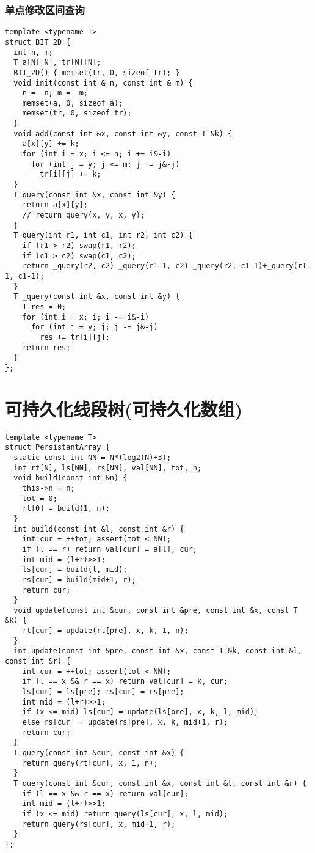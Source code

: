 \documentclass[12pt]{article}
\begin{document}
{{{{{{{{{{{{{{{{{{\subsubsection{单点修改区间查询}
{\setmainfont{Consolas}
\begin{lstlisting}
template <typename T>
struct BIT_2D {
  int n, m;
  T a[N][N], tr[N][N];
  BIT_2D() { memset(tr, 0, sizeof tr); }
  void init(const int &_n, const int &_m) {
    n = _n; m = _m;
    memset(a, 0, sizeof a);
    memset(tr, 0, sizeof tr);
  }
  void add(const int &x, const int &y, const T &k) {
    a[x][y] += k;
    for (int i = x; i <= n; i += i&-i)
      for (int j = y; j <= m; j += j&-j)
        tr[i][j] += k;
  }
  T query(const int &x, const int &y) {
    return a[x][y];
    // return query(x, y, x, y);
  }
  T query(int r1, int c1, int r2, int c2) {
    if (r1 > r2) swap(r1, r2);
    if (c1 > c2) swap(c1, c2);
    return _query(r2, c2)-_query(r1-1, c2)-_query(r2, c1-1)+_query(r1-1, c1-1);
  }
  T _query(const int &x, const int &y) {
    T res = 0;
    for (int i = x; i; i -= i&-i)
      for (int j = y; j; j -= j&-j)
        res += tr[i][j];
    return res;
  }
};
\end{lstlisting}

\section{可持久化线段树(可持久化数组)}

{\setmainfont{Consolas}
\begin{lstlisting}
template <typename T>
struct PersistantArray {
  static const int NN = N*(log2(N)+3);
  int rt[N], ls[NN], rs[NN], val[NN], tot, n;
  void build(const int &n) {
    this->n = n;
    tot = 0;
    rt[0] = build(1, n);
  }
  int build(const int &l, const int &r) {
    int cur = ++tot; assert(tot < NN);
    if (l == r) return val[cur] = a[l], cur;
    int mid = (l+r)>>1;
    ls[cur] = build(l, mid);
    rs[cur] = build(mid+1, r);
    return cur;
  }
  void update(const int &cur, const int &pre, const int &x, const T &k) {
    rt[cur] = update(rt[pre], x, k, 1, n);
  }
  int update(const int &pre, const int &x, const T &k, const int &l, const int &r) {
    int cur = ++tot; assert(tot < NN);
    if (l == x && r == x) return val[cur] = k, cur;
    ls[cur] = ls[pre]; rs[cur] = rs[pre];
    int mid = (l+r)>>1;
    if (x <= mid) ls[cur] = update(ls[pre], x, k, l, mid);
    else rs[cur] = update(rs[pre], x, k, mid+1, r);
    return cur;
  }
  T query(const int &cur, const int &x) {
    return query(rt[cur], x, 1, n);
  }
  T query(const int &cur, const int &x, const int &l, const int &r) {
    if (l == x && r == x) return val[cur];
    int mid = (l+r)>>1;
    if (x <= mid) return query(ls[cur], x, l, mid);
    return query(rs[cur], x, mid+1, r);
  }
};
\end{lstlisting}

}}}}}}}}}}}}}}}}}}}}
\end{document}
